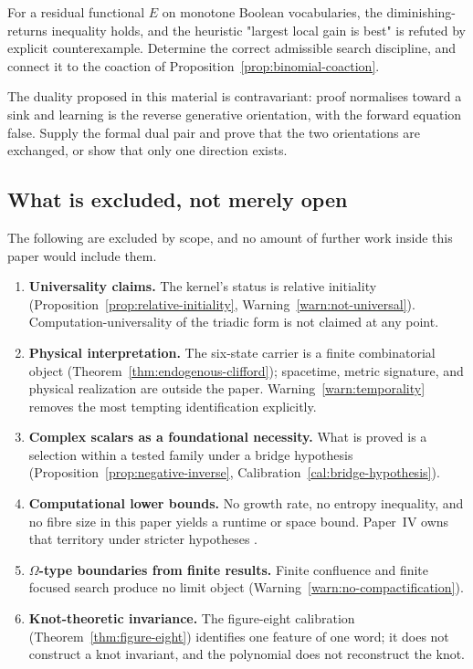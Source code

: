 \begin{problem}\label{prob:vocabulary}
For a residual functional $E$ on monotone Boolean vocabularies, the diminishing-returns
inequality holds, and the heuristic "largest local gain is best" is refuted by explicit
counterexample.  Determine the correct admissible search discipline, and connect it to the
coaction of Proposition~\ref{prop:binomial-coaction}.
\end{problem}

\begin{problem}\label{prob:reverse-dual}
The duality proposed in this material is contravariant: proof normalises toward a sink and
learning is the reverse generative orientation, with the forward equation false.  Supply the
formal dual pair and prove that the two orientations are exchanged, or show that only one
direction exists.
\end{problem}

\subsection{What is excluded, not merely open}

The following are excluded by scope, and no amount of further work inside this paper would
include them.

\begin{enumerate}
\item \textbf{Universality claims.}  The kernel's status is relative initiality
  (Proposition~\ref{prop:relative-initiality},
  Warning~\ref{warn:not-universal}).  Computation-universality of the triadic form is not
  claimed at any point.
\item \textbf{Physical interpretation.}  The six-state carrier is a finite combinatorial
  object (Theorem~\ref{thm:endogenous-clifford}); spacetime, metric signature, and physical
  realization are outside the paper.  Warning~\ref{warn:temporality} removes the most
  tempting identification explicitly.
\item \textbf{Complex scalars as a foundational necessity.}  What is proved is a selection
  within a tested family under a bridge hypothesis
  (Proposition~\ref{prop:negative-inverse}, Calibration~\ref{cal:bridge-hypothesis}).
\item \textbf{Computational lower bounds.}  No growth rate, no entropy inequality, and no
  fibre size in this paper yields a runtime or space bound.  Paper~IV owns that territory
  under stricter hypotheses \cite{Yuan2026AEGCondensation}.
\item \textbf{$\Omega$-type boundaries from finite results.}  Finite confluence and finite
  focused search produce no limit object
  (Warning~\ref{warn:no-compactification}).
\item \textbf{Knot-theoretic invariance.}  The figure-eight calibration
  (Theorem~\ref{thm:figure-eight}) identifies one feature of one word; it does not construct
  a knot invariant, and the polynomial does not reconstruct the knot.
\end{enumerate}


